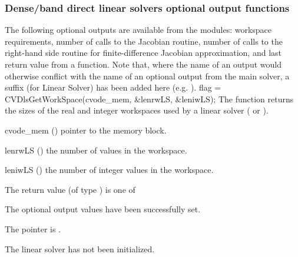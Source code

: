 \subsubsection{Dense/band direct linear solvers optional output functions}
\label{sss:optout_dls}
The following optional outputs are available from the {\cvdls} modules:
workspace requirements, number of calls to the Jacobian routine, number of 
calls to the right-hand side routine for finite-difference Jacobian approximation,
and last return value from a {\cvdls} function.
Note that, where the name of an output would otherwise conflict with
the name of an optional output from the main solver, a suffix 
(for Linear Solver) has been added here (e.g. ).
{
  flag = CVDlsGetWorkSpace(cvode\_mem, \&lenrwLS, \&leniwLS);
}
{
  The function  returns the sizes of the real and
  integer workspaces used by a {\cvdls} linear solver ({\cvdense} or {\cvband}).
}
{
  \begin{args}
  \item[cvode\_mem] ()
    pointer to the {\cvode} memory block.
  \item[lenrwLS] ()
    the number of  values in the {\cvdls} workspace.
  \item[leniwLS] ()
    the number of integer values in the {\cvdls} workspace.
  \end{args}
}
{
  The return value  (of type ) is one of
  \begin{args}
  \item[\Id{CVDLS\_SUCCESS}] 
    The optional output values have been successfully set.
  \item[\Id{CVDLS\_MEM\_NULL}]
    The  pointer is .
  \item[\Id{CVDLS\_LMEM\_NULL}]
    The {\cvdls} linear solver has not been initialized.
  \end{args}
}
